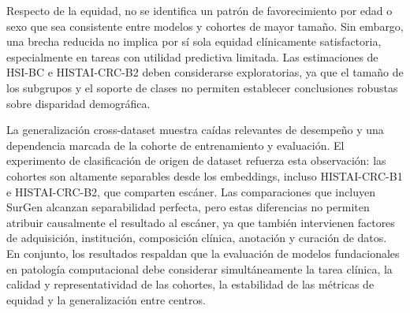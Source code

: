 Respecto de la equidad, no se identifica un patrón de favorecimiento por edad o sexo que sea consistente entre modelos y cohortes de mayor tamaño. Sin embargo, una brecha reducida no implica por sí sola equidad clínicamente satisfactoria, especialmente en tareas con utilidad predictiva limitada. Las estimaciones de HSI-BC e HISTAI-CRC-B2 deben considerarse exploratorias, ya que el tamaño de los subgrupos y el soporte de clases no permiten establecer conclusiones robustas sobre disparidad demográfica.

La generalización cross-dataset muestra caídas relevantes de desempeño y una dependencia marcada de la cohorte de entrenamiento y evaluación. El experimento de clasificación de origen de dataset refuerza esta observación: las cohortes son altamente separables desde los embeddings, incluso HISTAI-CRC-B1 e HISTAI-CRC-B2, que comparten escáner. Las comparaciones que incluyen SurGen alcanzan separabilidad perfecta, pero estas diferencias no permiten atribuir causalmente el resultado al escáner, ya que también intervienen factores de adquisición, institución, composición clínica, anotación y curación de datos. En conjunto, los resultados respaldan que la evaluación de modelos fundacionales en patología computacional debe considerar simultáneamente la tarea clínica, la calidad y representatividad de las cohortes, la estabilidad de las métricas de equidad y la generalización entre centros.